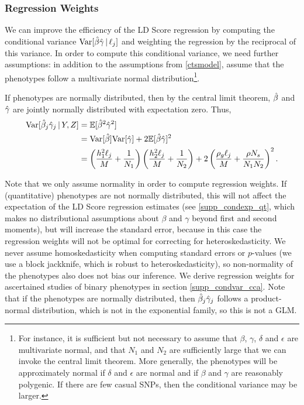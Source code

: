 \documentclass[11pt]{article}
\numberwithin{equation}{section}
\numberwithin{definition}{section}
\numberwithin{thm}{section}
\numberwithin{lemma}{section}
\numberwithin{prop}{section}
\numberwithin{cor}{section}
\numberwithin{hyp}{section}
\begin{document}
\subsubsection{Regression Weights}

We can improve the efficiency of the LD Score regression by computing the conditional variance 
$\mathrm{Var}[\hat{\beta}\hat{\gamma} \,|\,\ell_j]$
and weighting the regression by the reciprocal of this variance. 
In order to compute this conditional variance, 
we need further assumptions: in addition to the assumptions from \ref{ctsmodel}, 
assume that the phenotypes follow a multivariate normal distribution\footnote{
For instance, it is sufficient but not necessary to assume that $\beta$, $\gamma$, $\delta$ and $\epsilon$ are multivariate normal, 
and that $N_1$ and $N_2$ are sufficiently large that we can invoke the central limit theorem. 
More generally, the phenotypes will be approximately normal if $\delta$ and $\epsilon$ are normal 
and if $\beta$ and $\gamma$ are reasonably polygenic.
If there are few casual SNPs, then the conditional variance may be larger.}.

If phenotypes are normally distributed, then by the central limit theorem,
$\hat{\beta}$ and $\hat{\gamma}$ are jointly normally distributed with expectation zero. 
Thus,
\begin{align}
    \mathrm{Var}[\hat{\beta}_j\hat{\gamma}_j\,|\,Y,Z] 
&= 
	\mathbb{E}[\hat{\beta}^2\hat{\gamma}^2]\nonumber\\
&=  
	\mathrm{Var}[\hat{\beta}]\mathrm{Var}[\hat{\gamma}]
	+
	2\mathbb{E}[\hat{\beta}\hat{\gamma}]^2\nonumber\\
&= 
	\left( 
		\frac{h_{1}^2\ell_j}{M} 
		+ 
		\frac{1}{N_1} 
	\right) \left(  
		\frac{h_{2}^2\ell_j}{M} 
		+ 
		\frac{1}{N_2}
	\right) 
	+ 					
	2\left( 
		\frac{\rho_g\ell_j}{M} 
		+ 
		\frac{\rho N_s}{N_1N_2} 
	\right)^2.
\end{align}

Note that we only assume normality in order to compute regression weights.
If (quantitative) phenotypes are not normally distributed,
this will not affect the expectation of the LD Score regression estimates
(see \ref{supp_condexp_qt}, which makes no distributional assumptions about $\beta$ and $\gamma$ beyond first and second moments),
but will increase the standard error,
because in this case the regression weights will not be optimal for correcting for heteroskedasticity.
We never assume homoskedasticity when computing standard errors or $p$-values 
(we use a block jackknife, which is robust to heteroskedasticity), 
so non-normality of the phenotypes also does not bias our inference.
We derive regression weights for ascertained studies of binary phenotypes in section \ref{supp_condvar_cca}.
Note that if the phenotypes are normally distributed, then $\hat{\beta}_j\hat{\gamma}_j$
follows a product-normal distribution, which is not in the exponential family, so this is not a GLM.
\end{document}
